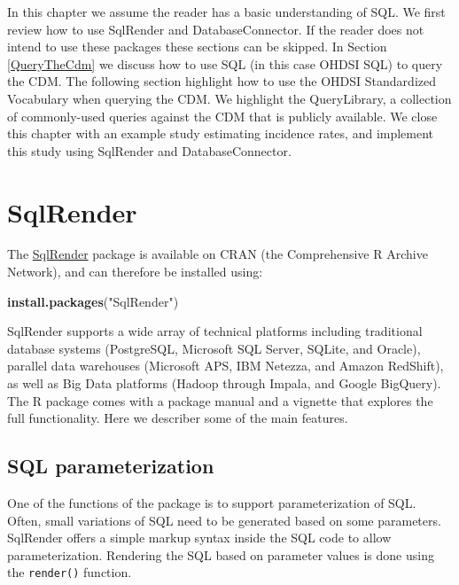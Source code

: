 \documentclass[11pt]{book}
\newenvironment{Shaded}{\begin{snugshade}}{\end{snugshade}}
\newcommand{\KeywordTok}[1]{\textcolor[rgb]{0.13,0.29,0.53}{\textbf{#1}}}
\newcommand{\NormalTok}[1]{#1}
\newcommand{\StringTok}[1]{\textcolor[rgb]{0.31,0.60,0.02}{#1}}
\theoremstyle{definition}
\theoremstyle{definition}
\theoremstyle{definition}
\theoremstyle{remark}
\begin{document}
In this chapter we assume the reader has a basic understanding of SQL. We first review how to use SqlRender and DatabaseConnector. If the reader does not intend to use these packages these sections can be skipped. In Section \ref{QueryTheCdm} we discuss how to use SQL (in this case OHDSI SQL) to query the CDM. The following section highlight how to use the OHDSI Standardized Vocabulary when querying the CDM. We highlight the QueryLibrary, a collection of commonly-used queries against the CDM that is publicly available. We close this chapter with an example study estimating incidence rates, and implement this study using SqlRender and DatabaseConnector.

\hypertarget{SqlRender}{%
\section{SqlRender}\label{SqlRender}}

The \href{https://ohdsi.github.io/SqlRender/}{SqlRender} package is available on CRAN (the Comprehensive R Archive Network), and can therefore be installed using:

\begin{Shaded}
\begin{Highlighting}[]
\KeywordTok{install.packages}\NormalTok{(}\StringTok{"SqlRender"}\NormalTok{)}
\end{Highlighting}
\end{Shaded}

SqlRender supports a wide array of technical platforms including traditional database systems (PostgreSQL, Microsoft SQL Server, SQLite, and Oracle), parallel data warehouses (Microsoft APS, IBM Netezza, and Amazon RedShift), as well as Big Data platforms (Hadoop through Impala, and Google BigQuery). The R package comes with a package manual and a vignette that explores the full functionality. Here we describer some of the main features.

\hypertarget{sql-parameterization}{%
\subsection{SQL parameterization}\label{sql-parameterization}}

One of the functions of the package is to support parameterization of SQL. Often, small variations of SQL need to be generated based on some parameters. SqlRender offers a simple markup syntax inside the SQL code to allow parameterization. Rendering the SQL based on parameter values is done using the \texttt{render()} function.
\end{document}
